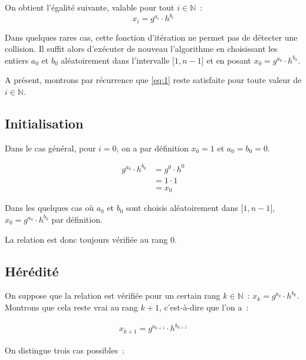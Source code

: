        On obtient l'égalité suivante, valable pour tout $i \in \mathbb{N}$~:
        \begin{equation} \label{eq:1}
          x_i = g^{a_i} \cdot h^{b_i}
        \end{equation}

		Dans quelques rares cas, cette fonction d'itération ne permet pas de détecter une collision. Il suffit alors d'exécuter de nouveau l'algorithme en choisissant les entiers $a_0$ et $b_0$ aléatoirement dans l'intervalle $\mathopen{[}1,n-1\mathclose{]}$ et en posant $x_0 = g^{a_0} \cdot h^{b_0}$.
		
		A présent, montrons par récurrence que \eqref{eq:1} reste satisfaite pour toute valeur de $i \in \mathbb{N}$.

        \subsection*{Initialisation}

        Dans le cas général, pour $i = 0$, on a par définition $x_0 = 1$ et $a_0 = b_0 = 0$.

        \begin{align*}
          g^{a_0} \cdot h^{b_0} &= g^{0} \cdot h^{0} \\
                                         &= 1 \cdot 1 \\
                                         &= x_0
        \end{align*}

        Dans les quelques cas où $a_0$ et $b_0$ sont choisis aléatoirement dans $\mathopen{[}1,n-1\mathclose{]}$, $x_0 = g^{a_0} \cdot h^{b_0}$ par définition.
        
        La relation est donc toujours vérifiée au rang $0$.

        \subsection*{Hérédité}

        On suppose que la relation est vérifiée pour un certain rang $k \in \mathbb{N}$~: $x_k = g^{a_k} \cdot h^{b_k}$. Montrons que cela reste vrai au rang $k + 1$, c'est-à-dire que l'on a~:

        \begin{align*}
          x_{k+1} = g^{a_{k+1}} \cdot h^{b_{k+1}}
        \end{align*}

        On distingue trois cas possibles~:

